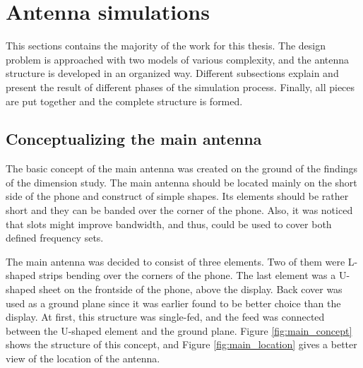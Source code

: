 \section{Antenna simulations}
\label{sec:simulations}
This sections contains the majority of the work for this thesis. The design problem is approached with two models of various complexity, and the antenna structure is developed in an organized way. Different subsections explain and present the result of different phases of the simulation process. Finally, all pieces are put together and the complete structure is formed.




\subsection{Conceptualizing the main antenna}
\label{sec:conceptualizing}
The basic concept of the main antenna was created on the ground of the findings of the dimension study. The main antenna should be located mainly on the short side of the phone and construct of simple shapes. Its elements should be rather short and they can be banded over the corner of the phone. Also, it was noticed that slots might improve bandwidth, and thus, could be used to cover both defined frequency sets. 

The main antenna was decided to consist of three elements. Two of them were L-shaped strips bending over the corners of the phone. The last element was a U-shaped sheet on the frontside of the phone, above the display. Back cover was used as a ground plane since it was earlier found to be better choice than the display. At first, this structure was single-fed, and the feed was connected between the U-shaped element and the ground plane. Figure \ref{fig:main_concept} shows the structure of this concept, and Figure \ref{fig:main_location} gives a better view of the location of the antenna.

